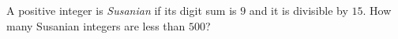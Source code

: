 A positive integer is \emph{Susanian} if its digit sum is $9$ and it is divisible by $15$. How many Susanian integers are less than $500$?
